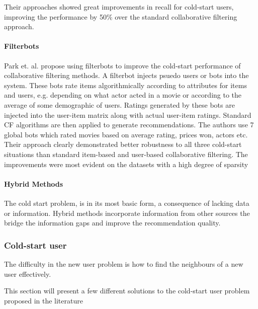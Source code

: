Their approaches showed great improvements in recall for cold-start users, improving the performance by 50$\%$ over the standard collaborative filtering approach.


\paragraph{Filterbots}


Park et. al. \cite{Park2006} propose using filterbots to improve the cold-start performance of collaborative filtering methods. A filterbot injects psuedo users or bots into the system. These bots rate items algorithmically according to attributes for items and users, e.g. depending on what actor acted in a movie or according to the average of some demographic of users. Ratings generated by these bots are injected into the user-item matrix along with actual user-item ratings. Standard CF algorithms are then applied to generate recommendations. The authors use 7 global bots which rated movies based on average rating, prices won, actors etc. Their approach clearly demonstrated better robustness to all three cold-start situations than standard item-based and user-based collaborative filtering. The improvements were most evident on the datasets with a high degree of sparsity

\paragraph{Hybrid Methods}

The cold start problem, is in its most basic form, a consequence of lacking data or information. Hybrid methods incorporate information from other sources the bridge the information gaps and improve the recommendation quality.

\subsubsection{Cold-start user}


The difficulty in the new user problem is how to find the neighbours of a new user effectively.

This section will present a few different solutions to the cold-start user problem proposed in the literature


